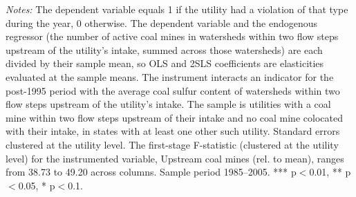 \begin{table}[htbp]
\begin{minipage}{\linewidth}
\vspace{4pt}
\footnotesize
\raggedright
\textit{Notes:} The dependent variable equals 1 if the utility had a violation of that type during the year, 0 otherwise. The dependent variable and the endogenous regressor (the number of active coal mines in watersheds within two flow steps upstream of the utility's intake, summed across those watersheds) are each divided by their sample mean, so OLS and 2SLS coefficients are elasticities evaluated at the sample means. The instrument interacts an indicator for the post-1995 period with the average coal sulfur content of watersheds within two flow steps upstream of the utility's intake. The sample is utilities with a coal mine within two flow steps upstream of their intake and no coal mine colocated with their intake, in states with at least one other such utility. Standard errors clustered at the utility level. The first-stage F-statistic (clustered at the utility level) for the instrumented variable, Upstream coal mines (rel. to mean), ranges from 38.73 to 49.20 across columns. Sample period 1985--2005. *** p$<$0.01, ** p$<$0.05, * p$<$0.1.
\end{minipage}
\end{table}
